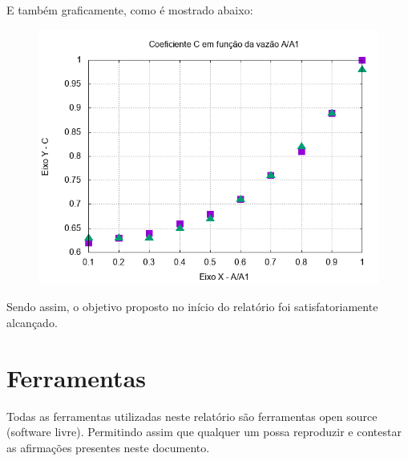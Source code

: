 \documentclass[12pt, hidelinks]{article}
\begin{document}
\newpage
E também graficamente, como é mostrado abaixo:
\begin{figure}[!h]
  \centering
  \includegraphics[width=12cm]{figuras/coef.png}\\
\end{figure}

Sendo assim, o objetivo proposto no início do relatório foi satisfatoriamente alcançado.

\newpage
\section{Ferramentas}
Todas as ferramentas utilizadas neste relatório são ferramentas open source (software livre).
Permitindo assim que qualquer um possa reproduzir e contestar as afirmações presentes neste documento.
\end{document}
